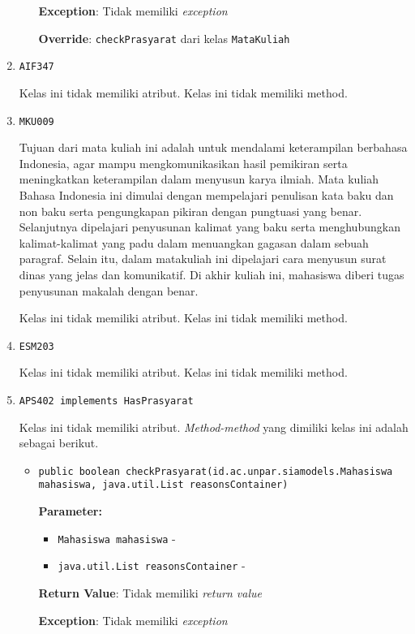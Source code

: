 \documentclass{article}
\begin{document}
\begin{enumerate}
\begin{itemize}
\textbf{Exception}: Tidak memiliki \textit{exception}

\textbf{Override}: \texttt{checkPrasyarat} dari kelas \texttt{MataKuliah}

\end{itemize}
\item \texttt{AIF347}



Kelas ini tidak memiliki atribut. Kelas ini tidak memiliki method. \item \texttt{MKU009}

Tujuan dari mata kuliah ini adalah untuk mendalami keterampilan berbahasa Indonesia, agar 
 mampu mengkomunikasikan hasil pemikiran serta meningkatkan keterampilan dalam menyusun karya
 ilmiah. Mata kuliah Bahasa Indonesia ini dimulai dengan mempelajari penulisan kata baku dan 
 non baku serta pengungkapan pikiran dengan pungtuasi yang benar. Selanjutnya dipelajari 
 penyusunan kalimat yang baku serta menghubungkan kalimat-kalimat yang padu dalam menuangkan 
 gagasan dalam sebuah paragraf. Selain itu, dalam matakuliah ini dipelajari cara menyusun
 surat dinas yang jelas dan komunikatif. Di akhir kuliah ini, mahasiswa diberi tugas
 penyusunan makalah dengan benar.

Kelas ini tidak memiliki atribut. Kelas ini tidak memiliki method. \item \texttt{ESM203}



Kelas ini tidak memiliki atribut. Kelas ini tidak memiliki method. \item \texttt{APS402 implements HasPrasyarat}



Kelas ini tidak memiliki atribut. \textit{Method-method} yang dimiliki kelas ini adalah sebagai berikut.
\begin{itemize}
\item \texttt{public boolean checkPrasyarat(id.ac.unpar.siamodels.Mahasiswa mahasiswa, java.util.List reasonsContainer)}



\textbf{Parameter:}
\begin{itemize}
\item \texttt{Mahasiswa mahasiswa} - 
\item \texttt{java.util.List reasonsContainer} - 
\end{itemize}
\textbf{Return Value}: Tidak memiliki \textit{return value}

\textbf{Exception}: Tidak memiliki \textit{exception}


\end{itemize}
\end{enumerate}
\end{document}
